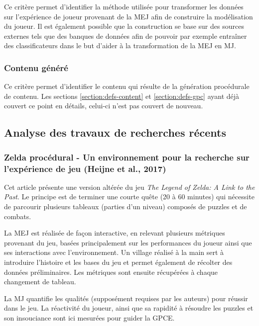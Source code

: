 \documentclass[a4paper,11pt]{article}
\begin{document}
        Ce critère permet d'identifier la méthode utilisée pour transformer les données sur l'expérience de joueur provenant de la MEJ afin de construire la modélisation du joueur.
        Il est également possible que la construction se base sur des sources externes tels que des banques de données afin de pouvoir par exemple entraîner des classificateurs dans le but d'aider à la transformation de la MEJ en MJ.

      \subsubsection{Contenu généré}

        Ce critère permet d'identifier le contenu qui résulte de la génération procédurale de contenu.
        Les sections \ref{section:defs-content} et \ref{section:defs-gpc} ayant déjà couvert ce point en détails, celui-ci n'est pas couvert de nouveau. 


      \subsection{Analyse des travaux de recherches récents}\label{section:review}

      \subsubsection{Zelda procédural - Un environnement pour la recherche sur l'expérience de jeu (Heijne et al., 2017)}
        
        Cet article présente une version altérée du jeu \textit{The Legend of Zelda: A Link to the Past}.
        Le principe est de terminer une courte quête (20 à 60 minutes) qui nécessite de parcourir plusieurs tableaux (parties d'un niveau) composés de puzzles et de combats.
        
        La MEJ est réalisée de façon interactive, en relevant plusieurs métriques provenant du jeu, basées principalement sur les performances du joueur ainsi que ses interactions avec l'environnement.
        Un village réalisé à la main sert à introduire l'histoire et les bases du jeu et permet également de récolter des données préliminaires.
        Les métriques sont ensuite récupérées à chaque changement de tableau.

        La MJ quantifie les qualités (supposément requises par les auteurs) pour réussir dans le jeu.
        La réactivité du joueur, ainsi que sa rapidité à résoudre les puzzles et son insouciance sont ici mesurées pour guider la GPCE.
\end{document}
